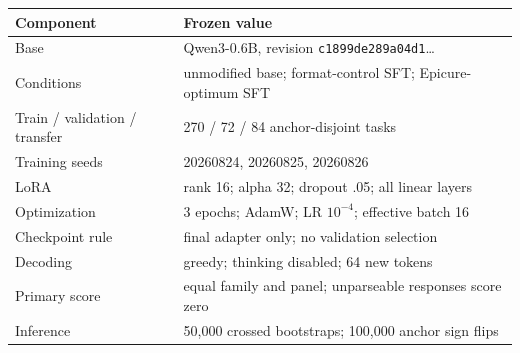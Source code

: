 \documentclass[10pt,twocolumn]{article}
\begin{document}
\begin{center}
  \centering
  \small
  \begin{tabular}{@{}l l@{}}
    \toprule
    Component & Frozen value \\
    \midrule
    Base & Qwen3-0.6B, revision \texttt{c1899de289a04d1}\ldots \\
    Conditions & unmodified base; format-control SFT; Epicure-optimum SFT \\
    Train / validation / transfer & 270 / 72 / 84 anchor-disjoint tasks \\
    Training seeds & 20260824, 20260825, 20260826 \\
    LoRA & rank 16; alpha 32; dropout .05; all linear layers \\
    Optimization & 3 epochs; AdamW; LR $10^{-4}$; effective batch 16 \\
    Checkpoint rule & final adapter only; no validation selection \\
    Decoding & greedy; thinking disabled; 64 new tokens \\
    Primary score & equal family and panel; unparseable responses score zero \\
    Inference & 50,000 crossed bootstraps; 100,000 anchor sign flips \\
    \bottomrule
  \end{tabular}
\end{center}

\begin{center}
  \centering
  \small
  
\end{center}

\begin{center}
  \centering
  \small
  
\end{center}
\end{document}
